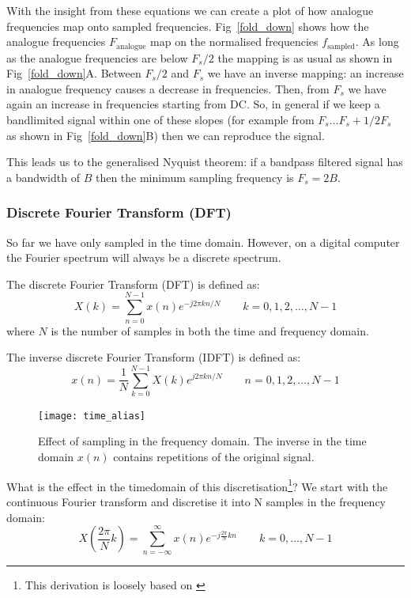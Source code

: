 \documentclass[12pt,a4paper]{article}
\begin{document}
With the insight from these equations we can create
a plot of how analogue frequencies map onto sampled frequencies.
Fig~\ref{fold_down} shows how the analogue frequencies $F_\textrm{analogue}$
map on the normalised frequencies $f_\textrm{sampled}$.
As long as the analogue frequencies are below $F_s/2$ the mapping
is as usual as shown in Fig~\ref{fold_down}A. 
Between $F_s/2$ and $F_s$ we have an inverse mapping:
an increase in analogue frequency causes a decrease in frequencies.
Then, from $F_s$ we have again an increase in frequencies starting
from DC. So,
in general if we keep a bandlimited signal within one of these
slopes (for example from $F_s \ldots F_s + 1/2 F_s$ as 
shown in Fig~\ref{fold_down}B) then we can
reproduce the signal.

This leads us to the generalised Nyquist theorem: if a bandpass
filtered signal has a bandwidth of $B$ then the minimum sampling
frequency is $F_s = 2B$.

\subsubsection{Discrete Fourier Transform (DFT)}
So far we have only sampled in the time domain. However, on
a digital computer the Fourier spectrum will always be a discrete
spectrum.

The discrete Fourier Transform (DFT) is defined as:
\begin{equation}
X(k) = \sum_{n=0}^{N-1} x(n) e^{-j2\pi kn / N} \qquad k=0,1,2, \ldots, N-1
\label{DFT}
\end{equation}
where $N$ is the number of samples in both the time and frequency domain.

The inverse discrete Fourier Transform (IDFT) is defined as:
\begin{equation}
x(n) = \frac{1}{N} \sum_{k=0}^{N-1} X(k) e^{j 2\pi kn/N} \qquad n=0,1,2,\ldots, N-1
\end{equation}

\begin{figure}[!hbt]
\begin{center}
\mbox{\texttt{[image: time\_alias]}}
\end{center}
\caption{Effect of sampling in the frequency domain. The
inverse in the time domain $x(n)$ contains repetitions of
the original signal.
\label{time_alias}}
\end{figure}


What is the effect in the timedomain of this discretisation\footnote{This derivation is loosely based on \citet{Proakis1996}}? We start with
the continuous Fourier transform
and discretise it into N samples in the frequency domain:
\begin{equation}
X\left(\frac{2\pi}{N}k\right) = \sum_{n = -\infty}^{\infty} x(n) e^{-j\frac{2\pi}{N}kn} \qquad k = 0, \ldots, N-1
\end{equation}
\end{document}
